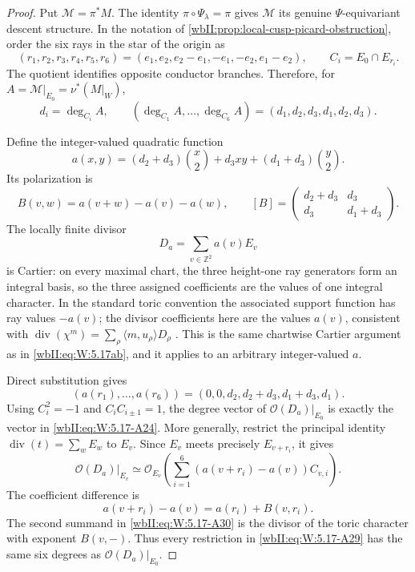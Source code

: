 \begin{proof}
Put \(\mathcal M=\pi^*M\).  The identity
\(\pi\circ\Psi_\lambda=\pi\) gives \(\mathcal M\) its genuine
\(\Psi\)-equivariant descent structure.  In the notation of
\cref{wbII:prop:local-cusp-picard-obstruction}, order the six rays in the star
of the origin as
\[
 (r_1,r_2,r_3,r_4,r_5,r_6)
 =(e_1,e_2,e_2-e_1,-e_1,-e_2,e_1-e_2),
 \qquad C_i=E_0\cap E_{r_i}.
\tag{W.123}\label{wbII:eq:W:5.17-A23}
\]
The quotient identifies opposite conductor branches.  Therefore, for
\(A=\mathcal M|_{E_0}=\nu^*(M|_W)\),
\[
 d_i=\deg_{C_i}A,
 \qquad
 (\deg_{C_1}A,\ldots,\deg_{C_6}A)
 =(d_1,d_2,d_3,d_1,d_2,d_3).
\tag{W.124}\label{wbII:eq:W:5.17-A24}
\]

Define the integer-valued quadratic function
\[
 a(x,y)
 =(d_2+d_3)\binom{x}{2}+d_3xy+(d_1+d_3)\binom{y}{2}.
\tag{W.125}\label{wbII:eq:W:5.17-A25}
\]
Its polarization is
\[
 B(v,w)=a(v+w)-a(v)-a(w),
 \qquad
 [B]=
 \begin{pmatrix}
  d_2+d_3&d_3\\ d_3&d_1+d_3
 \end{pmatrix}.
\tag{W.126}\label{wbII:eq:W:5.17-A26}
\]
The locally finite divisor
\[
 D_a=\sum_{v\in\mathbb Z^2}a(v)E_v
\tag{W.127}\label{wbII:eq:W:5.17-A27}
\]
is Cartier: on every maximal chart, the three height-one ray generators
form an integral basis, so the three assigned coefficients are the values
of one integral character.  In the standard toric convention the associated
support function has ray values \(-a(v)\); the divisor coefficients here are
the values \(a(v)\), consistent with
\(\operatorname{div}(\chi^m)=\sum_\rho\langle m,u_\rho\rangle D_\rho\)
\cite[Propositions~4.1.1--4.1.2, p.~171; Theorems~4.2.8,
p.~181 and~4.2.12, p.~184]{CoxLittleSchenck2011}.
This is the same chartwise Cartier argument as
in \eqref{wbII:eq:W:5.17ab}, and it applies to an arbitrary integer-valued \(a\).

Direct substitution gives
\[
 (a(r_1),\ldots,a(r_6))
 =(0,0,d_2,d_2+d_3,d_1+d_3,d_1).
\tag{W.128}\label{wbII:eq:W:5.17-A28}
\]
Using \(C_i^2=-1\) and \(C_iC_{i\pm1}=1\), the degree vector of
\(\mathcal O(D_a)|_{E_0}\) is exactly the vector in \eqref{wbII:eq:W:5.17-A24}.  More
generally, restrict the principal identity
\(\operatorname{div}(t)=\sum_wE_w\) to \(E_v\).  Since \(E_v\) meets
precisely \(E_{v+r_i}\), it gives
\[
 \mathcal O(D_a)|_{E_v}
 \simeq
 \mathcal O_{E_v}\!\left(
   \sum_{i=1}^6(a(v+r_i)-a(v))C_{v,i}
 \right).
\tag{W.129}\label{wbII:eq:W:5.17-A29}
\]
The coefficient difference is
\[
 a(v+r_i)-a(v)=a(r_i)+B(v,r_i).
\tag{W.130}\label{wbII:eq:W:5.17-A30}
\]
The second summand in \eqref{wbII:eq:W:5.17-A30} is the divisor of the toric character
with exponent \(B(v,-)\).  Thus every restriction in \eqref{wbII:eq:W:5.17-A29} has the
same six degrees as \(\mathcal O(D_a)|_{E_0}\).


\end{proof}
